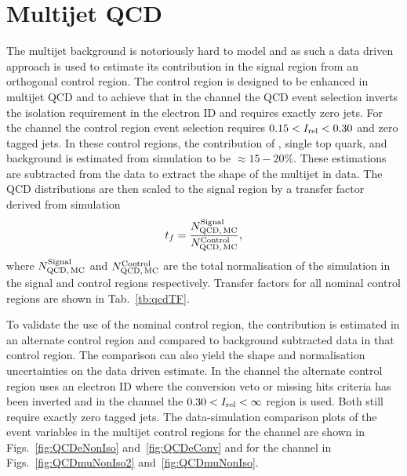 \section{Multijet QCD} %
\label{sec:multijet_qcd}

The multijet \QCD{} background is notoriously hard to model and as such a data driven approach is used to estimate its contribution in the signal region from an orthogonal control region.
The control region is designed to be enhanced in multijet QCD and to achieve that in the \eJets{} channel the QCD event selection inverts the isolation requirement in the electron ID and requires exactly zero \bquark{} jets.
For the \muJets{} channel the control region event selection requires $0.15<I_{\mathrm{rel}}<0.30$ and zero \bquark{} tagged jets.
In these control regions, the contribution of \ttbar{}, single top quark, and \Vjets{} background is estimated from simulation to be $\approx15-20\%$.
These estimations are subtracted from the data to extract the shape of the multijet \QCD{} in data.
The QCD distributions are then scaled to the signal region by a transfer factor derived from simulation
\begin{equation*}
	t_{f}=\frac{N^{\mathrm{Signal}}_{\mathrm{QCD},\,\mathrm{MC}}}{N^{\mathrm{Control}}_{\mathrm{QCD},\,\mathrm{MC}}},
\end{equation*}
where $N^{\mathrm{Signal}}_{\mathrm{QCD},\,\mathrm{MC}}$ and $N^{\mathrm{Control}}_{\mathrm{QCD},\,\mathrm{MC}}$ are the total normalisation of the \QCD{} simulation in the signal and control regions respectively.
Transfer factors for all nominal control regions are shown in Tab.~\ref{tb:qcdTF}.


To validate the use of the nominal control region, the \QCD{} contribution is estimated in an alternate control region and compared to background subtracted data in that control region.
The comparison can also yield the shape and normalisation uncertainties on the data driven \QCD{} estimate.
In the \eJets{} channel the alternate control region uses an electron ID where the conversion veto or missing hits criteria has been inverted and in the \muJets{} channel the $0.30<I_{\mathrm{rel}}<\infty$ region is used.
Both still require exactly zero \bquark{} tagged jets.
The data-simulation comparison plots of the event variables in the multijet \QCD{} control regions for the \eJets{} channel are shown in Figs.~\ref{fig:QCDeNonIso} and~\ref{fig:QCDeConv} and for the \muJets{} channel in Figs.~\ref{fig:QCDmuNonIso2} and~\ref{fig:QCDmuNonIso}.

